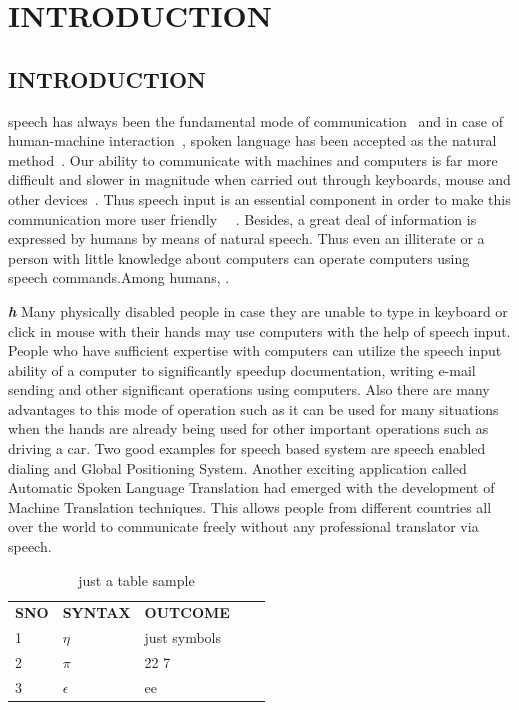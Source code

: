 \documentclass[a4paper,12pt]{report} %
\begin{document}
{}
\chapter{INTRODUCTION}
\section{INTRODUCTION}

speech has always been the fundamental mode of communication~\cite{Devi2017} and in case of human-machine interaction~\cite{Suresh2017}, spoken language has been accepted as the natural method~\cite{Manikandan2012}. Our ability to communicate with machines and computers is far more difficult and slower in magnitude when carried out through keyboards, mouse and other devices~\cite{Rajkumar2017}. Thus speech input is an essential component in order to make this communication more user friendly~\cite{K2017} ~\cite{Maheswari2017}. Besides, a great deal of information is expressed by humans by means of natural speech. Thus even an illiterate or a person with little knowledge about computers can operate computers using speech commands.Among humans\cite{adler2011}, .\par
\textbf{\textit{h}}
Many physically disabled people in case they are unable to type in keyboard or click in mouse with their hands may use computers with the help of speech input. People who have sufficient expertise with computers can utilize the speech input ability of a computer to significantly speedup documentation, writing e-mail sending and other significant operations using computers. Also there are many advantages to this mode of operation such as it can be used for many situations when the hands are already being used for other important operations such as driving a car. Two good examples for speech based system are speech enabled dialing and Global Positioning System. Another exciting application called Automatic Spoken Language Translation had emerged with the development of Machine Translation techniques. This allows people from different countries all over the world to communicate freely without any professional translator via speech. \par
\begin{table}[]
\centering
\begin{tabular}{|l|l|l|ll}
\cline{1-3}
\textbf{SNO} & \textbf{SYNTAX}         & \textbf{OUTCOME} &  &  \\ \cline{1-3}
1            & $\eta$     & just symbols     &  &  \\ \cline{1-3}
2            & $\pi$      & 22 7             &  &  \\ \cline{1-3}
3            &$ \epsilon$ & ee               &  &  \\ \cline{1-3}
\end{tabular}
\caption{just a table sample}
\end{table}
\end{document}
